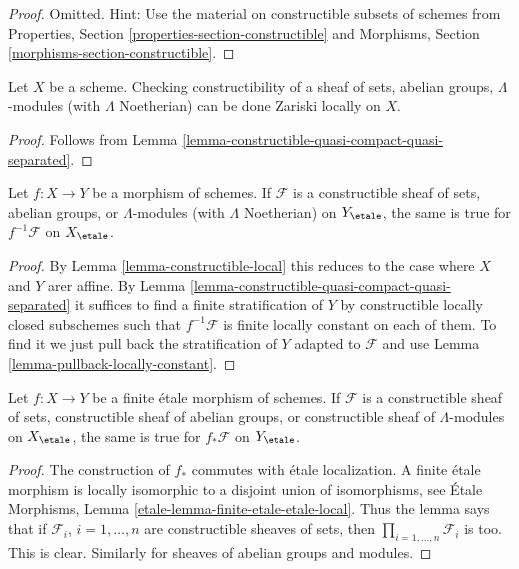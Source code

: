 \begin{proof}
Omitted. Hint: Use the material on constructible subsets of schemes
from Properties, Section \ref{properties-section-constructible} and
Morphisms, Section \ref{morphisms-section-constructible}.
\end{proof}

\begin{lemma}
\label{lemma-constructible-local}
Let $X$ be a scheme. Checking constructibility of a sheaf
of sets, abelian groups, $\Lambda$-modules (with $\Lambda$ Noetherian)
can be done Zariski locally on $X$.
\end{lemma}

\begin{proof}
Follows from Lemma \ref{lemma-constructible-quasi-compact-quasi-separated}.
\end{proof}

\begin{lemma}
\label{lemma-pullback-constructible}
Let $f : X \to Y$ be a morphism of schemes. If $\mathcal{F}$ is a
constructible sheaf of sets, abelian groups, or $\Lambda$-modules
(with $\Lambda$ Noetherian) on $Y_\etale$, the same
is true for $f^{-1}\mathcal{F}$ on $X_\etale$.
\end{lemma}

\begin{proof}
By Lemma \ref{lemma-constructible-local} this reduces to the case
where $X$ and $Y$ arer affine. By
Lemma \ref{lemma-constructible-quasi-compact-quasi-separated}
it suffices to find a finite stratification of $Y$ by constructible
locally closed subschemes such that $f^{-1}\mathcal{F}$ is finite locally
constant on each of them.
To find it we just pull back the stratification of $Y$ adapted to
$\mathcal{F}$ and use
Lemma \ref{lemma-pullback-locally-constant}.
\end{proof}

\begin{lemma}
\label{lemma-pushforward-constructible}
Let $f : X \to Y$ be a finite \'etale morphism of schemes.
If $\mathcal{F}$ is a constructible sheaf of sets,
constructible sheaf of abelian groups, or constructible
sheaf of $\Lambda$-modules on $X_\etale$, the same is
true for $f_*\mathcal{F}$ on $Y_\etale$.
\end{lemma}

\begin{proof}
The construction of $f_*$ commutes with \'etale localization.
A finite \'etale morphism is locally isomorphic to a disjoint union
of isomorphisms, see
\'Etale Morphisms, Lemma \ref{etale-lemma-finite-etale-etale-local}.
Thus the lemma says that if $\mathcal{F}_i$, $i = 1, \ldots, n$
are constructible sheaves of sets, then
$\prod_{i = 1, \ldots, n} \mathcal{F}_i$ is too.
This is clear. Similarly for sheaves of abelian groups and modules.
\end{proof}

